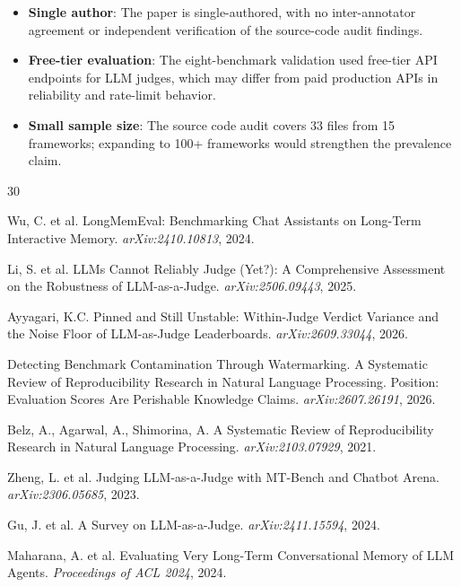 \documentclass[11pt]{article}
\begin{document}
\begin{itemize}
\item \textbf{Single author}: The paper is single-authored, with no inter-annotator agreement or independent verification of the source-code audit findings.
\item \textbf{Free-tier evaluation}: The eight-benchmark validation used free-tier API endpoints for LLM judges, which may differ from paid production APIs in reliability and rate-limit behavior.
\item \textbf{Small sample size}: The source code audit covers 33 files from 15 frameworks; expanding to 100+ frameworks would strengthen the prevalence claim.
\end{itemize}
\begin{thebibliography}{30}

Wu, C. et al.
\newblock LongMemEval: Benchmarking Chat Assistants on Long-Term Interactive Memory. \newblock \emph{arXiv:2410.10813}, 2024.

Li, S. et al.
\newblock LLMs Cannot Reliably Judge (Yet?): A Comprehensive Assessment on the Robustness of LLM-as-a-Judge.
\newblock \emph{arXiv:2506.09443}, 2025.

Ayyagari, K.C.
\newblock Pinned and Still Unstable: Within-Judge Verdict Variance and the Noise Floor of LLM-as-Judge Leaderboards.
\newblock \emph{arXiv:2609.33044}, 2026.

Detecting Benchmark Contamination Through Watermarking.
\newblock A Systematic Review of Reproducibility Research in Natural Language Processing. \newblock Position: Evaluation Scores Are Perishable Knowledge Claims.
\newblock \emph{arXiv:2607.26191}, 2026.

Belz, A., Agarwal, A., Shimorina, A.
\newblock A Systematic Review of Reproducibility Research in Natural Language Processing.
\newblock \emph{arXiv:2103.07929}, 2021.

Zheng, L. et al.
\newblock Judging LLM-as-a-Judge with MT-Bench and Chatbot Arena.
\newblock \emph{arXiv:2306.05685}, 2023.

Gu, J. et al.
\newblock A Survey on LLM-as-a-Judge.
\newblock \emph{arXiv:2411.15594}, 2024.

Maharana, A. et al.
\newblock Evaluating Very Long-Term Conversational Memory of LLM Agents.
\newblock \emph{Proceedings of ACL 2024}, 2024.


\end{thebibliography}
\end{document}
